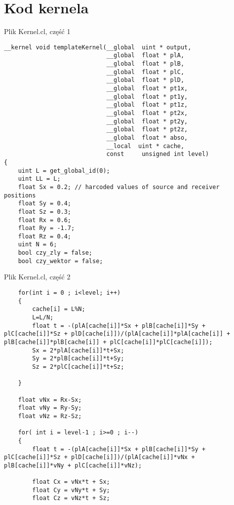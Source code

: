 \chapter{Kod kernela}
\begin{program}
\caption{Plik Kernel.cl, część 1}
\begin{lstlisting}
__kernel void templateKernel(__global  uint * output,
                             __global  float * plA,
                             __global  float * plB,
                             __global  float * plC,
                             __global  float * plD,
                             __global  float * pt1x,
                             __global  float * pt1y,
                             __global  float * pt1z,
                             __global  float * pt2x,
                             __global  float * pt2y,
                             __global  float * pt2z,
                             __global  float * abso,
                             __local  uint * cache,
                             const     unsigned int level)
{
    uint L = get_global_id(0);
    uint LL = L;
    float Sx = 0.2; // harcoded values of source and receiver positions
    float Sy = 0.4;
    float Sz = 0.3;
    float Rx = 0.6;
    float Ry = -1.7;
    float Rz = 0.4;
    uint N = 6;
    bool czy_zly = false;
    bool czy_wektor = false;
\end{lstlisting}
\end{program}
\begin{program}
\caption{Plik Kernel.cl, część 2}
\begin{lstlisting}
    for(int i = 0 ; i<level; i++)
    {
        cache[i] = L%N;
        L=L/N;
        float t = -(plA[cache[i]]*Sx + plB[cache[i]]*Sy + plC[cache[i]]*Sz + plD[cache[i]])/(plA[cache[i]]*plA[cache[i]] + plB[cache[i]]*plB[cache[i]] + plC[cache[i]]*plC[cache[i]]);
        Sx = 2*plA[cache[i]]*t+Sx;
        Sy = 2*plB[cache[i]]*t+Sy;
        Sz = 2*plC[cache[i]]*t+Sz;
        
    }
    
    float vNx = Rx-Sx;
    float vNy = Ry-Sy;
    float vNz = Rz-Sz;

    for( int i = level-1 ; i>=0 ; i--)
    {
        float t = -(plA[cache[i]]*Sx + plB[cache[i]]*Sy + plC[cache[i]]*Sz + plD[cache[i]])/(plA[cache[i]]*vNx + plB[cache[i]]*vNy + plC[cache[i]]*vNz);
        
        float Cx = vNx*t + Sx;
        float Cy = vNy*t + Sy;
        float Cz = vNz*t + Sz;

\end{lstlisting}
\end{program}

